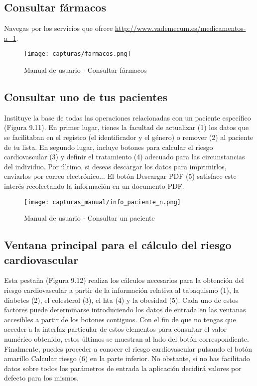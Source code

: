 \documentclass[11pt,spanish,
		listoftables,listoffigures]
		{tfgplantilla}
\begin{document}
\newpage
\subsection {Consultar fármacos}

Navegas por los servicios que ofrece \url {http://www.vademecum.es/medicamentos-a_1}.

\begin{figure}[H]
\centering
\texttt{[image: capturas/farmacos.png]}
\caption{Manual de usuario - Consultar fármacos}
\end{figure}

\subsection {Consultar uno de tus pacientes}

Instituye la base de todas las operaciones relacionadas con un paciente específico (Figura 9.11). En primer lugar, tienes la facultad de actualizar (1) los datos que se facilitaban en el registro (el identificador y el género) o remover (2) al paciente de tu lista. En segundo lugar, incluye botones para calcular el riesgo cardiovascular (3) y definir el tratamiento (4) adecuado para las circunstancias del individuo. Por último, si deseas descargar los datos para imprimirlos, enviarlos por correo electrónico... El botón \textquotedbl Descargar PDF\textquotedbl{} (5) satisface este interés recolectando la información en un documento PDF.

\begin{figure}[H]
\centering
\texttt{[image: capturas\_manual/info\_paciente\_n.png]}
\caption{Manual de usuario - Consultar un paciente}
\end{figure}

\newpage
\subsection {Ventana principal para el cálculo del riesgo cardiovascular}

Esta pestaña (Figura 9.12) realiza los cálculos necesarios para la obtención del riesgo cardiovascular a partir de la información relativa al tabaquismo (1), la diabetes (2), el colesterol (3), el hta (4) y la obesidad (5). Cada uno de estos factores puede determinarse introduciendo los datos de entrada en las ventanas accesibles a partir de los botones contiguos. Con el fin de que no tengas que acceder a la interfaz particular de estos elementos para consultar el valor numérico obtenido, estos últimos se muestran al lado del botón correspondiente. Finalmente, puedes proceder a conocer el riesgo cardiovascular pulsando el botón amarillo \textquotedbl Calcular riesgo\textquotedbl{} (6) en la parte inferior. No obstante, si no has facilitado datos sobre todos los parámetros de entrada la aplicación decidirá valores por defecto para los mismos.
\end{document}
